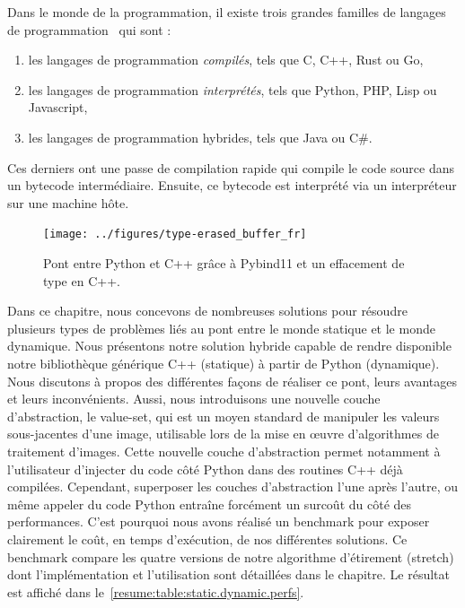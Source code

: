 Dans le monde de la programmation, il existe trois grandes familles de langages de
programmation~\parencite{prechelt.2000.comparison} qui sont :
\begin{enumerate}
  \item les langages de programmation \emph{compilés}, tels que C, C++, Rust ou Go,
  \item les langages de programmation \emph{interprétés}, tels que Python, PHP, Lisp ou Javascript,
  \item les langages de programmation hybrides, tels que Java ou C\#.
\end{enumerate}
Ces derniers ont une passe de compilation rapide qui compile le code source dans un bytecode intermédiaire. Ensuite, ce
bytecode est interprété via un interpréteur sur une machine hôte.

\begin{figure}[htbp]
  \centering
  \texttt{[image: ../figures/type-erased\_buffer\_fr]}
  \caption[]{Pont entre Python et C++ grâce à Pybind11 et un effacement de type en C++.}
  \label{resume:fig:type-erased.buffer}
\end{figure}

Dans ce chapitre, nous concevons de nombreuses solutions pour résoudre plusieurs types de problèmes liés au pont entre
le monde statique et le monde dynamique. Nous présentons notre solution hybride capable de rendre disponible notre
bibliothèque générique C++ (statique) à partir de Python (dynamique). Nous discutons à propos des différentes façons de
réaliser ce pont, leurs avantages et leurs inconvénients. Aussi, nous introduisons une nouvelle couche d'abstraction, le
value-set, qui est un moyen standard de manipuler les valeurs sous-jacentes d'une image, utilisable lors de la mise en
\oe{}uvre d'algorithmes de traitement d'images. Cette nouvelle couche d'abstraction permet notamment à l'utilisateur
d'injecter du code côté Python dans des routines C++ déjà compilées. Cependant, superposer les couches d'abstraction
l'une après l'autre, ou même appeler du code Python entraîne forcément un surcoût du côté des performances. C'est
pourquoi nous avons réalisé un benchmark pour exposer clairement le coût, en temps d'exécution, de nos différentes
solutions. Ce benchmark compare les quatre versions de notre algorithme d'étirement (stretch) dont l'implémentation et
l'utilisation sont détaillées dans le chapitre. Le résultat est affiché dans
le~\cref{resume:table:static.dynamic.perfs}.

